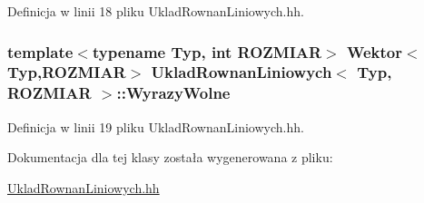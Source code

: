 Definicja w linii 18 pliku UkladRownanLiniowych.hh.

\hypertarget{class_uklad_rownan_liniowych_ad6f84eeebcec882a5755868e05395486}{
\subsubsection[{WyrazyWolne}]{\setlength{\rightskip}{0pt plus 5cm}template$<$typename Typ, int ROZMIAR$>$ {\bf Wektor}$<$Typ,ROZMIAR$>$ {\bf UkladRownanLiniowych}$<$ Typ, ROZMIAR $>$::{\bf WyrazyWolne}}}
\label{class_uklad_rownan_liniowych_ad6f84eeebcec882a5755868e05395486}


Definicja w linii 19 pliku UkladRownanLiniowych.hh.



Dokumentacja dla tej klasy została wygenerowana z pliku:\begin{DoxyCompactItemize}
\item 
\hyperlink{_uklad_rownan_liniowych_8hh}{UkladRownanLiniowych.hh}\end{DoxyCompactItemize}
